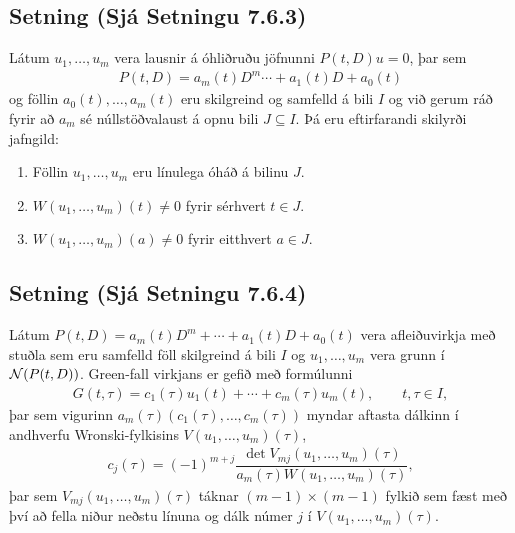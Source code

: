 \documentclass[a4paper,10pt,icelandic]{sphinxmanual}
\begin{document}
\subsection{Setning (Sjá Setningu 7.6.3)}
\label{\detokenize{Kafli07:id5}}
Látum \(u_1,\dots,u_m\) vera lausnir á óhliðruðu jöfnunni \(P(t,D)u=0\), þar sem
\begin{equation*}
\begin{split}P(t,D)=a_m(t)D^m \cdots+a_1(t)D+a_0(t)\end{split}
\end{equation*}
og föllin \(a_0(t), \ldots, a_m(t)\) eru skilgreind og samfelld á bili \(I\) og við gerum ráð fyrir að \(a_m\) sé núllstöðvalaust á opnu bili \(J\subseteq I\). Þá eru eftirfarandi skilyrði jafngild:
\begin{enumerate}
%
\item {} 
Föllin \(u_1,\dots,u_m\) eru línulega óháð á bilinu \(J\).

\item {} 
\(W(u_1,\dots,u_m)(t)\neq 0\) fyrir sérhvert \(t\in J\).

\item {} 
\(W(u_1,\dots,u_m)(a)\neq 0\) fyrir eitthvert \(a\in J\).

\end{enumerate}


\subsection{Setning (Sjá Setningu 7.6.4)}
\label{\detokenize{Kafli07:setning-sja-setningu-7-6-4}}
Látum \(P(t,D)=a_m(t)D^m+\cdots+a_1(t)D+a_0(t)\) vera afleiðuvirkja með stuðla sem eru samfelld föll skilgreind á bili \(I\) og \(u_1,\dots,u_m\) vera grunn í \({\cal N}(P(t,D))\). Green-fall virkjans er gefið með formúlunni
\begin{equation*}
\begin{split}G(t,\tau)=c_1(\tau)u_1(t)+\cdots+c_m(\tau)u_m(t), \qquad t,\tau\in I,\end{split}
\end{equation*}
þar sem vigurinn \(a_m({\tau})(c_1(\tau),\dots,c_m(\tau))\) myndar aftasta dálkinn í andhverfu Wronski-fylkisins \(V(u_1,\dots,u_m)(\tau)\),
\begin{equation*}
\begin{split}c_j(\tau)=(-1)^{m+j} \dfrac{\det V_{mj}(u_1,\dots,u_m)(\tau)}
{a_m({\tau})W(u_1,\dots, u_m)(\tau)},\end{split}
\end{equation*}
þar sem \(V_{mj}(u_1,\dots,u_m)(\tau)\) táknar \((m-1)\times (m-1)\) fylkið sem fæst með því að fella niður neðstu línuna og dálk númer \(j\) í \(V(u_1,\dots,u_m)(\tau)\).
\end{document}
